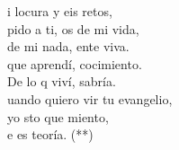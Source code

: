 \begin{cancion}
\begin{chorus}
		i locura y eis retos,\\
		pido a ti, os de mi vida, \\
		 de mi nada, ente viva.\\
	\jump
		que aprendí, cocimiento. \\
		De lo q viví, sabría.\\
		uando quiero vir tu evangelio, \\
		yo sto que miento,\\
		e es teoría. (**)\jump\\
	\end{chorus}%
\end{cancion}%
